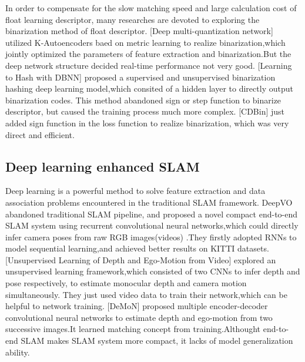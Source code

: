 \documentclass[conference]{IEEEtran}
\begin{document}
In order to compensate for the slow matching speed and large calculation cost of float learning descriptor, many researches are devoted to exploring the binarization method of float descriptor.
	[Deep  multi-quantization network]\cite{c16} utilized K-Autoencoders baed on metric learning to realize binarization,which jointly optimized the parameters of feature extraction and  binarization.But the deep network structure  decided  real-time performance not very good. 
[Learning to Hash  with DBNN]\cite{c17} proposed a supervised and unsupervised binarization hashing deep learning model,which consited of a hidden layer to directly output binarization codes. This method abandoned sign or step function to binarize descriptor, but caused the training process much more complex. 
[CDBin]\cite{c18} just added sign function in the loss function to realize binarization, which was very direct and efficient.

\subsection{Deep learning enhanced SLAM}
Deep learning is a powerful method to solve feature extraction and data association problems encountered in the traditional SLAM framework. 
DeepVO \cite{c19}abandoned traditional SLAM pipeline, and proposed a novel compact end-to-end SLAM system using recurrent convolutional neural networks,which could directly infer camera poses from raw RGB images(videos) .They firstly adopted RNNs to model sequential learning,and achieved better results on KITTI datasets. 
[Unsupervised Learning of Depth and Ego-Motion from Video]\cite{c20} explored an unsupervised learning framework,which consisted of two CNNs to infer depth and pose respectively, to estimate monocular depth and camera motion simultaneously. They just used video data to train their network,which can be helpful to network training.
[DeMoN]\cite{c21} proposed multiple encoder-decoder convolutional neural networks to estimate depth and ego-motion from two successive images.It learned matching concept from training.Althought end-to-end SLAM makes SLAM system more compact, it lacks of model generalization ability.
\end{document}
